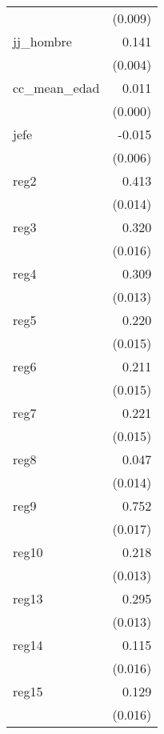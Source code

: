 {\begin{longtable}{l*{1}{D{.}{.}{-1}}}
            &     (0.009)         \\
\addlinespace
jj\_hombre   &       0.141\sym{***}\\
            &     (0.004)         \\
\addlinespace
cc\_mean\_edad&       0.011\sym{***}\\
            &     (0.000)         \\
\addlinespace
jefe        &      -0.015\sym{*}  \\
            &     (0.006)         \\
\addlinespace
reg2        &       0.413\sym{***}\\
            &     (0.014)         \\
\addlinespace
reg3        &       0.320\sym{***}\\
            &     (0.016)         \\
\addlinespace
reg4        &       0.309\sym{***}\\
            &     (0.013)         \\
\addlinespace
reg5        &       0.220\sym{***}\\
            &     (0.015)         \\
\addlinespace
reg6        &       0.211\sym{***}\\
            &     (0.015)         \\
\addlinespace
reg7        &       0.221\sym{***}\\
            &     (0.015)         \\
\addlinespace
reg8        &       0.047\sym{**} \\
            &     (0.014)         \\
\addlinespace
reg9        &       0.752\sym{***}\\
            &     (0.017)         \\
\addlinespace
reg10       &       0.218\sym{***}\\
            &     (0.013)         \\
\addlinespace
reg13       &       0.295\sym{***}\\
            &     (0.013)         \\
\addlinespace
reg14       &       0.115\sym{***}\\
            &     (0.016)         \\
\addlinespace
reg15       &       0.129\sym{***}\\
            &     (0.016)         \\

\end{longtable}}
